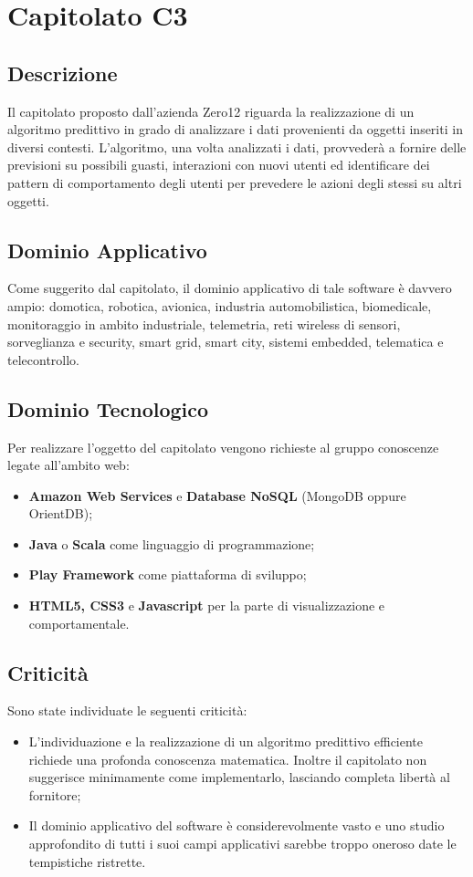 \newpage
\section{Capitolato C3}
\subsection{Descrizione}
Il capitolato proposto dall'azienda Zero12 riguarda la realizzazione di un algoritmo predittivo in grado di analizzare i dati provenienti da \textsf{oggetti} inseriti in diversi contesti. L'algoritmo, una volta analizzati i dati, provvederà a fornire delle previsioni su possibili guasti, interazioni con nuovi utenti ed identificare dei pattern di comportamento degli utenti per prevedere le azioni degli stessi su altri oggetti.

\subsection{Dominio Applicativo}
Come suggerito dal capitolato, il dominio applicativo di tale software è davvero ampio: domotica, robotica, avionica, industria automobilistica, biomedicale, monitoraggio in ambito industriale, telemetria, reti wireless di sensori, sorveglianza e security, smart grid, smart city, sistemi embedded, telematica e telecontrollo.

\subsection{Dominio Tecnologico}
Per realizzare l'oggetto del capitolato vengono richieste al gruppo conoscenze legate all'ambito web:
\begin{itemize}
\item \textbf{Amazon Web Services} e \textbf{Database NoSQL} (MongoDB oppure OrientDB);
\item \textbf{Java} o \textbf{Scala} come linguaggio di programmazione;
\item \textbf{Play Framework} come piattaforma di sviluppo;
\item \textbf{HTML5, CSS3} e \textbf{Javascript} per la parte di visualizzazione e comportamentale.
\end{itemize}

\subsection{Criticità}
Sono state individuate le seguenti criticità:
\begin{itemize}
\item L'individuazione e la realizzazione di un algoritmo predittivo efficiente richiede una profonda conoscenza matematica. Inoltre il capitolato non suggerisce minimamente come implementarlo, lasciando completa libertà al fornitore;
\item Il dominio applicativo del software è considerevolmente vasto e uno studio approfondito di tutti i suoi campi applicativi sarebbe troppo oneroso date le tempistiche ristrette.
\end{itemize}

